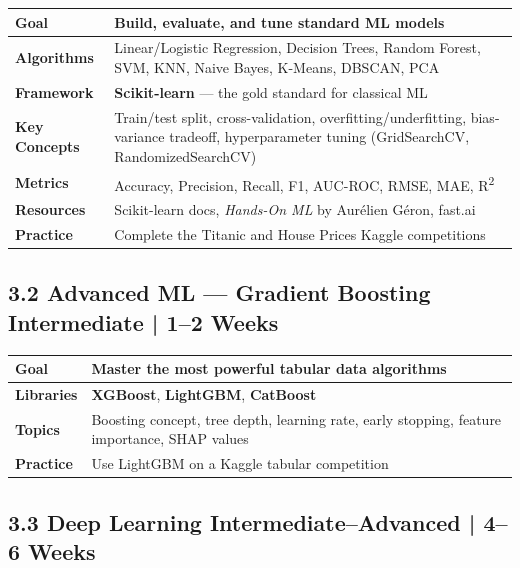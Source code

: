 \documentclass[a4paper,11pt]{article}
\begin{document}
\begin{tabular}{>{\bfseries}p{3cm} p{11.5cm}}
\toprule
Goal & Build, evaluate, and tune standard ML models \\
\midrule
Algorithms & Linear/Logistic Regression, Decision Trees, Random Forest, SVM, KNN, Naive Bayes, K-Means, DBSCAN, PCA \\
Framework & \textbf{Scikit-learn} — the gold standard for classical ML \\
Key Concepts & Train/test split, cross-validation, overfitting/underfitting, bias-variance tradeoff, hyperparameter tuning (GridSearchCV, RandomizedSearchCV) \\
Metrics & Accuracy, Precision, Recall, F1, AUC-ROC, RMSE, MAE, R\textsuperscript{2} \\
Resources & Scikit-learn docs, \textit{Hands-On ML} by Aurélien Géron, fast.ai \\
Practice & Complete the Titanic and House Prices Kaggle competitions \\
\bottomrule
\end{tabular}

\subsection{3.2 Advanced ML — Gradient Boosting \hfill \small\normalfont\color{darkgray}Intermediate | 1--2 Weeks}

\begin{tabular}{>{\bfseries}p{3cm} p{11.5cm}}
\toprule
Goal & Master the most powerful tabular data algorithms \\
\midrule
Libraries & \textbf{XGBoost}, \textbf{LightGBM}, \textbf{CatBoost} \\
Topics & Boosting concept, tree depth, learning rate, early stopping, feature importance, SHAP values \\
Practice & Use LightGBM on a Kaggle tabular competition \\
\bottomrule
\end{tabular}

\subsection{3.3 Deep Learning \hfill \small\normalfont\color{darkgray}Intermediate--Advanced | 4--6 Weeks}
\end{document}
